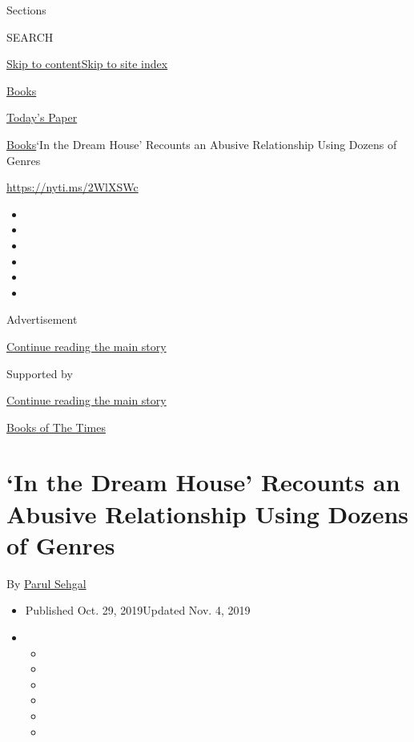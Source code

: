 Sections

SEARCH

\protect\hyperlink{site-content}{Skip to
content}\protect\hyperlink{site-index}{Skip to site index}

\href{https://www.nytimes.com/section/books}{Books}

\href{https://myaccount.nytimes.com/auth/login?response_type=cookie\&client_id=vi}{}

\href{https://www.nytimes.com/section/todayspaper}{Today's Paper}

\href{/section/books}{Books}\textbar{}`In the Dream House' Recounts an
Abusive Relationship Using Dozens of Genres

\url{https://nyti.ms/2WlXSWc}

\begin{itemize}
\item
\item
\item
\item
\item
\item
\end{itemize}

Advertisement

\protect\hyperlink{after-top}{Continue reading the main story}

Supported by

\protect\hyperlink{after-sponsor}{Continue reading the main story}

\href{/column/books-of-the-times}{Books of The Times}

\hypertarget{in-the-dream-house-recounts-an-abusive-relationship-using-dozens-of-genres}{%
\section{`In the Dream House' Recounts an Abusive Relationship Using
Dozens of
Genres}\label{in-the-dream-house-recounts-an-abusive-relationship-using-dozens-of-genres}}

By \href{https://www.nytimes.com/by/parul-sehgal}{Parul Sehgal}

\begin{itemize}
\item
  Published Oct. 29, 2019Updated Nov. 4, 2019
\item
  \begin{itemize}
  \item
  \item
  \item
  \item
  \item
  \item
  \end{itemize}
\end{itemize}

